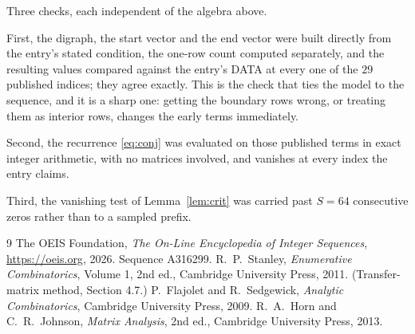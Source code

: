 \documentclass[11pt,a4paper]{article}
\theoremstyle{plain}
\theoremstyle{definition}
\begin{document}
Three checks, each independent of the algebra above.

First, the digraph, the start vector and the end vector were built directly from the
entry's stated condition, the one-row count computed separately, and the resulting values
compared against the entry's DATA at every one of the $29$ published indices; they
agree exactly. This is the check that ties the model to the sequence, and it is a sharp one:
getting the boundary rows wrong, or treating them as interior rows, changes the early terms
immediately.

Second, the recurrence \eqref{eq:conj} was evaluated on those published terms in exact
integer arithmetic, with no matrices involved, and vanishes at every index the entry claims.

Third, the vanishing test of Lemma~\ref{lem:crit} was carried past $S=64$ consecutive
zeros rather than to a sampled prefix.

\begin{thebibliography}{9}
 The OEIS Foundation, \emph{The On-Line Encyclopedia of Integer
Sequences}, \url{https://oeis.org}, 2026. Sequence A316299.
 R.~P.~Stanley, \emph{Enumerative Combinatorics}, Volume 1, 2nd ed.,
Cambridge University Press, 2011. (Transfer-matrix method, Section 4.7.)
 P.~Flajolet and R.~Sedgewick, \emph{Analytic Combinatorics}, Cambridge
University Press, 2009.
 R.~A.~Horn and C.~R.~Johnson, \emph{Matrix Analysis}, 2nd ed., Cambridge
University Press, 2013.
\end{thebibliography}
\end{document}
